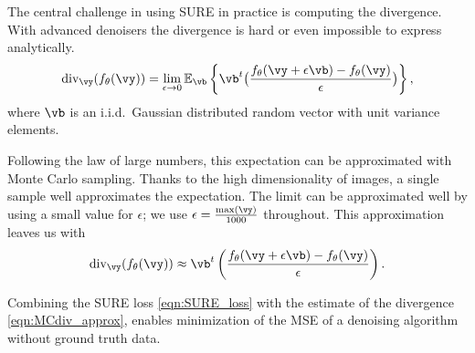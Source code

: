 \documentclass{article}
\begin{document}
The central challenge in using SURE in practice is computing the divergence. With advanced denoisers the divergence is hard or even impossible to express analytically.%
\begin{align}\label{eqn:MCdiv}
    \text{div}_\vy(f_\theta (\vy))=\lim_{\epsilon \rightarrow 0} \mathbb{E}_\vb \left\{ \vb^t \big( \frac{f_\theta(\vy+\epsilon \vb)-f_\theta(\vy)}{\epsilon} \big)\right\},
\end{align}
where $\vb$ is an i.i.d.~Gaussian distributed random vector with unit variance elements.


Following the law of large numbers, this expectation can be approximated with Monte Carlo sampling. Thanks to the high dimensionality of images, a single sample well approximates the expectation. The limit can be approximated well by using a small value for $\epsilon$; we use $\epsilon=\frac{\max(\vy)}{1000}$ throughout. This approximation leaves us with
\begin{align}\label{eqn:MCdiv_approx}
    \text{div}_\vy(f_\theta (\vy))\approx  \vb^t \left( \frac{f_\theta(\vy+\epsilon \vb)-f_\theta(\vy)}{\epsilon} \right).
\end{align}

Combining the SURE loss \eqref{eqn:SURE_loss} with the estimate of the divergence \eqref{eqn:MCdiv_approx}, enables minimization of the MSE of a denoising algorithm without ground truth data. 
\end{document}
